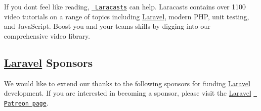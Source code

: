 If you don\textquotesingle{}t feel like reading, \href{https://laracasts.com}{\texttt{ Laracasts}} can help. Laracasts contains over 1100 video tutorials on a range of topics including \mbox{\hyperlink{namespaceLaravel}{Laravel}}, modern P\+HP, unit testing, and Java\+Script. Boost you and your team\textquotesingle{}s skills by digging into our comprehensive video library.

\subsection*{\mbox{\hyperlink{namespaceLaravel}{Laravel}} Sponsors}

We would like to extend our thanks to the following sponsors for funding \mbox{\hyperlink{namespaceLaravel}{Laravel}} development. If you are interested in becoming a sponsor, please visit the \mbox{\hyperlink{namespaceLaravel}{Laravel}} \href{https://patreon.com/taylorotwell}{\texttt{ Patreon page}}.


